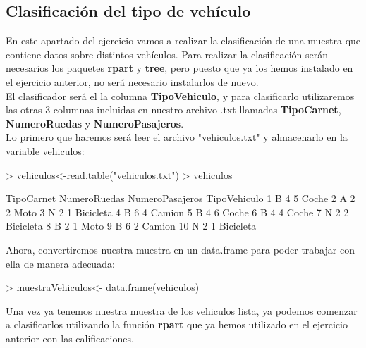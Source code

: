 \documentclass [a4paper] {article}
\begin{document}
\subsection{Clasificación del tipo de vehículo}
En este apartado del ejercicio vamos a realizar la clasificación de una muestra que contiene datos sobre distintos vehículos. Para
realizar la clasificación serán necesarios los paquetes \textbf{rpart} y \textbf{tree}, pero puesto que ya los hemos instalado en el
ejercicio anterior, no será necesario instalarlos de nuevo.\\
El clasificador será el la columna \textbf{TipoVehiculo}, y para clasificarlo utilizaremos las otras 3 columnas incluidas en nuestro
archivo .txt llamadas \textbf{TipoCarnet}, \textbf{NumeroRuedas} y \textbf{NumeroPasajeros}.\\
Lo primero que haremos será leer el archivo "vehiculos.txt" y almacenarlo en la variable vehiculos:

\begin{Schunk}
\begin{Sinput}
> vehiculos<-read.table("vehiculos.txt")
> vehiculos
\end{Sinput}
\begin{Soutput}
   TipoCarnet NumeroRuedas NumeroPasajeros TipoVehiculo
1           B            4               5        Coche
2           A            2               2         Moto
3           N            2               1    Bicicleta
4           B            6               4       Camion
5           B            4               6        Coche
6           B            4               4        Coche
7           N            2               2    Bicicleta
8           B            2               1         Moto
9           B            6               2       Camion
10          N            2               1    Bicicleta
\end{Soutput}
\end{Schunk}

Ahora, convertiremos nuestra muestra en un data.frame para poder trabajar con ella de manera adecuada:

\begin{Schunk}
\begin{Sinput}
> muestraVehiculos<- data.frame(vehiculos)
\end{Sinput}
\end{Schunk}

Una vez ya tenemos nuestra muestra de los vehiculos lista, ya podemos comenzar a clasificarlos utilizando la función
\textbf{rpart} que ya hemos utilizado en el ejercicio anterior con las calificaciones.
\end{document}
